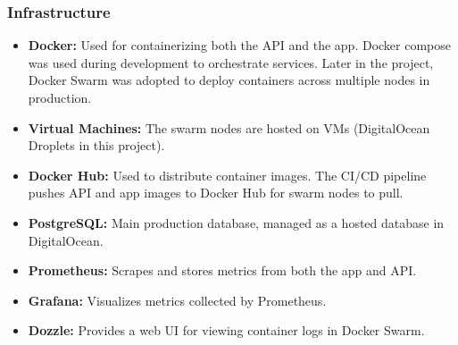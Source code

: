 \subsubsection{Infrastructure}
\begin{itemize}
    \item \textbf{Docker:} Used for containerizing both the API and the app. Docker compose was used during development to orchestrate services. Later in the project, Docker Swarm was adopted to deploy containers across multiple nodes in production.
    \item \textbf{Virtual Machines:} The swarm nodes are hosted on VMs (DigitalOcean Droplets in this project).
    \item \textbf{Docker Hub:} Used to distribute container images. The CI/CD pipeline pushes API and app images to Docker Hub for swarm nodes to pull.
    \item \textbf{PostgreSQL:} Main production database, managed as a hosted database in DigitalOcean.
    \item \textbf{Prometheus:} Scrapes and stores metrics from both the app and API.
    \item \textbf{Grafana:} Visualizes metrics collected by Prometheus.
    \item \textbf{Dozzle:} Provides a web UI for viewing container logs in Docker Swarm.
\end{itemize}